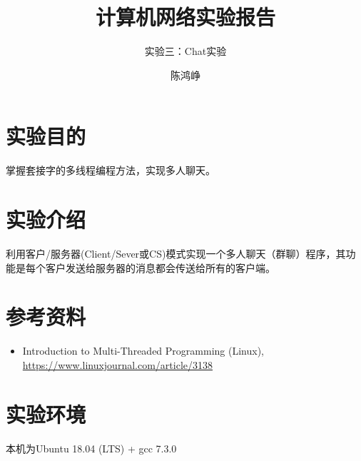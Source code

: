 \documentclass[logo,reportComp]{thesis}
\title{计算机网络实验报告}
\subtitle{实验三：Chat实验}
\author{陈鸿峥}
\begin{document}
\maketitle

\section{实验目的}
掌握套接字的多线程编程方法，实现多人聊天。

\section{实验介绍}
利用客户/服务器(Client/Sever或CS)模式实现一个多人聊天（群聊）程序，其功能是每个客户发送给服务器的消息都会传送给所有的客户端。
\begin{center}
\end{center}

\section{参考资料}
\begin{itemize}
	\item Introduction to Multi-Threaded Programming (Linux), \url{https://www.linuxjournal.com/article/3138}
\end{itemize}

\section{实验环境}
本机为Ubuntu 18.04 (LTS) + gcc 7.3.0
\end{document}
